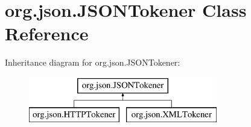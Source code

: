 \hypertarget{classorg_1_1json_1_1_j_s_o_n_tokener}{\section{org.\-json.\-J\-S\-O\-N\-Tokener Class Reference}
\label{classorg_1_1json_1_1_j_s_o_n_tokener}
}
Inheritance diagram for org.\-json.\-J\-S\-O\-N\-Tokener\-:\begin{figure}[H]
\begin{center}
\leavevmode
\includegraphics[height=2.000000cm]{classorg_1_1json_1_1_j_s_o_n_tokener}
\end{center}
\end{figure}
